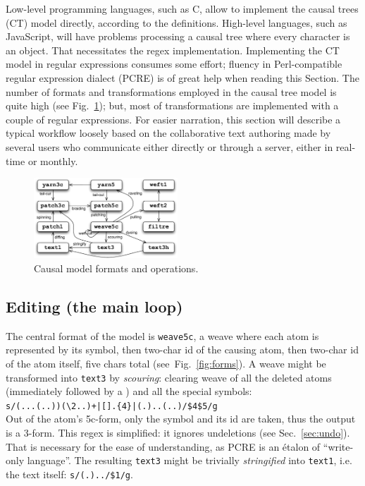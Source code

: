 \documentclass{sig-alternate}
\begin{document}
Low-level programming languages, such as C, allow to implement the  causal trees (CT) model directly, according to the definitions.
High-level languages, such as JavaScript, will have problems processing a causal tree where every character is an object.
That necessitates the regex implementation.
Implementing the CT model in regular expressions consumes some effort; fluency in Perl-compatible regular expression dialect (PCRE) is of great help when reading this Section. 
The number of formats and transformations employed in the causal tree model is quite high (see Fig.~\ref{fig:ops}); but, most of transformations are implemented with a couple of regular expressions. 
For easier narration, this section will describe a typical workflow loosely based on the collaborative text authoring made by several users who communicate either directly or through a server, either in real-time or monthly.

\begin{figure}[t] \label{fig:ops}
\includegraphics[width=0.48\textwidth]{operations.pdf}
\caption{Causal model formats and operations.} \label{fig:ops}
\end{figure}

\subsection{Editing (the main loop)}

The central format of the model is {\tt weave5c}, a weave where each atom is represented by its symbol, then two-char id of the causing atom, then two-char id of the atom itself, five chars total (see~Fig.~\ref{fig:forms}).
A weave might be transformed into {\tt text3} by \emph{scouring}: clearing weave of all the deleted atoms (immediately followed by a \bsp) and all the special symbols: \\
{\small \verb`s/(...(..))(`\bsp\verb`\2..)+|[`\bsp\zero\cnc\verb`].{4}|(.)..(..)/$4$5/g`}\\
Out of the atom's 5c-form, only the symbol and its id are taken, thus the output is a 3-form.
This regex is simplified: it ignores undeletions (see Sec.~\ref{sec:undo}).
That is necessary for the ease of understanding, as PCRE is an étalon of ``write-only language''. 
The resulting {\tt text3} might be trivially \emph{stringified} into {\tt text1}, i.e. the text itself: {\small \verb+s/(.)../$1/g+}.
\end{document}
